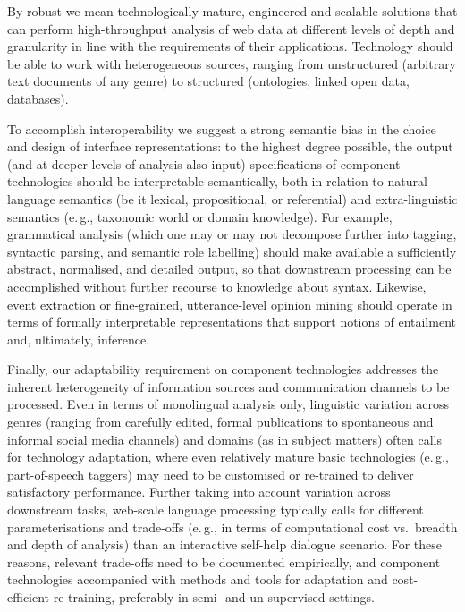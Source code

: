 \documentclass[10pt, plain]{../../metanetpaper}
\begin{document}
\begin{multicols}{2}
By robust we mean technologically mature, engineered and scalable solutions that can perform high-throughput analysis of web data at different levels of depth and granularity in line with the requirements of their applications. Technology should be able to work with heterogeneous sources, ranging from unstructured (arbitrary text documents of any genre) to structured (ontologies, linked open data, databases).

To accomplish interoperability we suggest a strong semantic bias in the choice and design of interface representations: to the highest degree possible, the output (and at deeper levels of analysis also input) specifications of component technologies should be interpretable semantically, both in relation to natural language semantics (be it lexical, propositional, or referential) and extra-linguistic semantics (e.\,g., taxonomic world or domain knowledge). For example, grammatical analysis (which one may or may not decompose further into tagging, syntactic parsing, and semantic role labelling) should make available a sufficiently abstract, normalised, and detailed output, so that downstream processing can be accomplished without further recourse to knowledge about syntax. Likewise, event extraction or fine-grained, utterance-level opinion mining should operate in terms of formally interpretable representations that support notions of entailment and, ultimately, inference.

Finally, our adaptability requirement on component technologies addresses the inherent heterogeneity of information sources and communication channels to be processed. Even in terms of monolingual analysis only, linguistic variation across genres (ranging from carefully edited, formal publications to spontaneous and informal social media channels) and domains (as in subject matters) often calls for technology adaptation, where even relatively mature basic technologies (e.\,g., part-of-speech taggers) may need to be customised or re-trained to deliver satisfactory performance. Further taking into account variation across downstream tasks, web-scale language processing typically calls for different parameterisations and trade-offs (e.\,g., in terms of computational cost vs.~breadth and depth of analysis) than an interactive self-help dialogue scenario. For these reasons, relevant trade-offs need to be documented empirically, and component technologies accompanied with methods and tools for adaptation and cost-efficient re-training, preferably in semi- and un-supervised settings.
 

\end{multicols}
\end{document}
